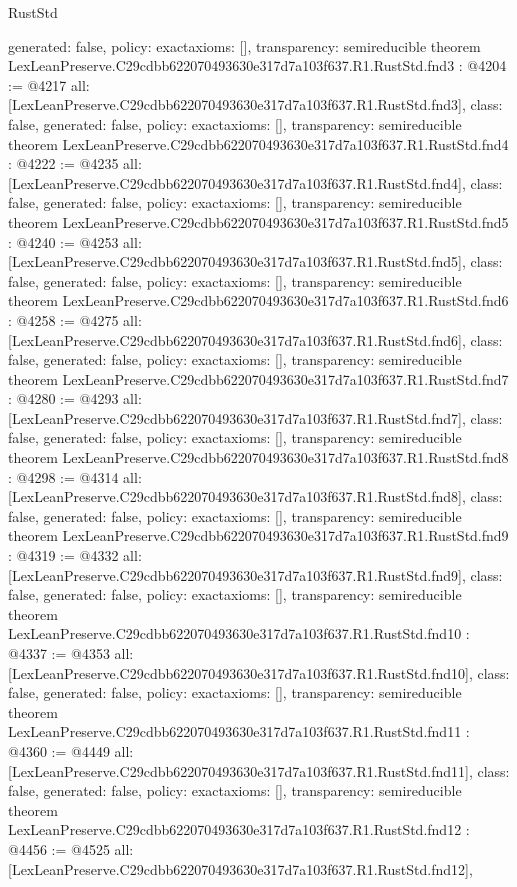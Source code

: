 \begin{lexlean}{RustStd}
\begin{coremodule}
{  generated: false,
  policy: exact{axioms: []},
  transparency: semireducible
}
theorem LexLeanPreserve.C29cdbb622070493630e317d7a103f637.R1.RustStd.fnd3 : @4204 := @4217 {
  all: [LexLeanPreserve.C29cdbb622070493630e317d7a103f637.R1.RustStd.fnd3],
  class: false,
  generated: false,
  policy: exact{axioms: []},
  transparency: semireducible
}
theorem LexLeanPreserve.C29cdbb622070493630e317d7a103f637.R1.RustStd.fnd4 : @4222 := @4235 {
  all: [LexLeanPreserve.C29cdbb622070493630e317d7a103f637.R1.RustStd.fnd4],
  class: false,
  generated: false,
  policy: exact{axioms: []},
  transparency: semireducible
}
theorem LexLeanPreserve.C29cdbb622070493630e317d7a103f637.R1.RustStd.fnd5 : @4240 := @4253 {
  all: [LexLeanPreserve.C29cdbb622070493630e317d7a103f637.R1.RustStd.fnd5],
  class: false,
  generated: false,
  policy: exact{axioms: []},
  transparency: semireducible
}
theorem LexLeanPreserve.C29cdbb622070493630e317d7a103f637.R1.RustStd.fnd6 : @4258 := @4275 {
  all: [LexLeanPreserve.C29cdbb622070493630e317d7a103f637.R1.RustStd.fnd6],
  class: false,
  generated: false,
  policy: exact{axioms: []},
  transparency: semireducible
}
theorem LexLeanPreserve.C29cdbb622070493630e317d7a103f637.R1.RustStd.fnd7 : @4280 := @4293 {
  all: [LexLeanPreserve.C29cdbb622070493630e317d7a103f637.R1.RustStd.fnd7],
  class: false,
  generated: false,
  policy: exact{axioms: []},
  transparency: semireducible
}
theorem LexLeanPreserve.C29cdbb622070493630e317d7a103f637.R1.RustStd.fnd8 : @4298 := @4314 {
  all: [LexLeanPreserve.C29cdbb622070493630e317d7a103f637.R1.RustStd.fnd8],
  class: false,
  generated: false,
  policy: exact{axioms: []},
  transparency: semireducible
}
theorem LexLeanPreserve.C29cdbb622070493630e317d7a103f637.R1.RustStd.fnd9 : @4319 := @4332 {
  all: [LexLeanPreserve.C29cdbb622070493630e317d7a103f637.R1.RustStd.fnd9],
  class: false,
  generated: false,
  policy: exact{axioms: []},
  transparency: semireducible
}
theorem LexLeanPreserve.C29cdbb622070493630e317d7a103f637.R1.RustStd.fnd10 : @4337 := @4353 {
  all: [LexLeanPreserve.C29cdbb622070493630e317d7a103f637.R1.RustStd.fnd10],
  class: false,
  generated: false,
  policy: exact{axioms: []},
  transparency: semireducible
}
theorem LexLeanPreserve.C29cdbb622070493630e317d7a103f637.R1.RustStd.fnd11 : @4360 := @4449 {
  all: [LexLeanPreserve.C29cdbb622070493630e317d7a103f637.R1.RustStd.fnd11],
  class: false,
  generated: false,
  policy: exact{axioms: []},
  transparency: semireducible
}
theorem LexLeanPreserve.C29cdbb622070493630e317d7a103f637.R1.RustStd.fnd12 : @4456 := @4525 {
  all: [LexLeanPreserve.C29cdbb622070493630e317d7a103f637.R1.RustStd.fnd12],
}
\end{coremodule}
\end{lexlean}
